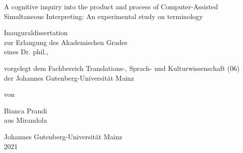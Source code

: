 \begin{titlepage}
\centering
A cognitive inquiry into the product and process of Computer-Assisted Simultaneous Interpreting: An experimental study on terminology
\vspace*{2cm}
 
Inauguraldissertation\\zur Erlangung des Akademischen Grades\\eines Dr. phil.,
\vspace*{3cm}

vorgelegt dem Fachbereich Translations-, Sprach- und Kulturwissenschaft (06)\\der Johannes Gutenberg-Universität Mainz
\vspace{2cm}

von
\vspace*{2cm}

Bianca Prandi\\aus Mirandola
\vspace*{2cm}

Johannes Gutenberg-Universität Mainz\\2021

\end{titlepage}

